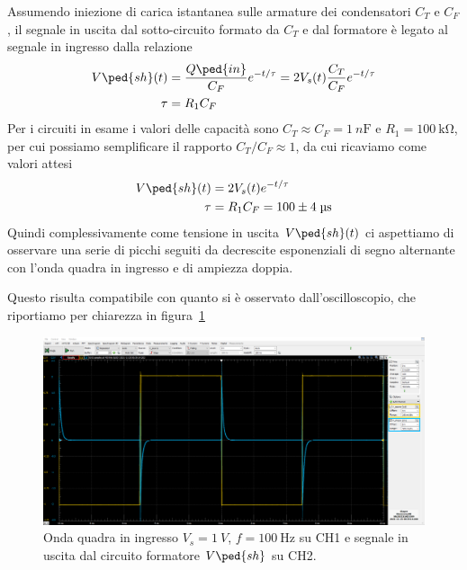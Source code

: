 \documentclass[10pt,a4paper]{article}
\begin{document}
Assumendo iniezione di carica istantanea sulle armature dei condensatori $C_T$
e $C_F$, il segnale in uscita dal sotto-circuito formato da $C_T$ e dal
formatore è legato al segnale in ingresso dalla relazione
\begin{align}\label{eq:Vsh}
V\ped{sh}(t) &= \frac{Q\ped{in}}{C_F} e^{-t/\tau} =
2V_s(t) \frac{C_T}{C_F} e^{-t/\tau} \\
\tau &= R_1 C_F
\end{align}
Per i circuiti in esame i valori delle capacità sono
$C_T \approx C_F = \SI{1}{n\F}$ e $R_1 = \SI{100}{\kilo\ohm}$,
per cui possiamo semplificare il rapporto $C_T/C_F \approx 1$, da cui
ricaviamo come valori attesi
\begin{align*}
V\ped{sh}(t) &= 2V_s(t) e^{-t/\tau} \\
\tau &= R_1 C_F = 100 \pm 4 \; \si{\micro\s}
\end{align*}
Quindi complessivamente come tensione in uscita $V\ped{sh} (t)$ ci aspettiamo
di osservare una serie di picchi seguiti da decrescite esponenziali di segno
alternante con l'onda quadra in ingresso e di ampiezza doppia.

Questo risulta compatibile con quanto si è osservato dall'oscilloscopio, che
riportiamo per chiarezza in figura~\ref{fig: shaper}
\begin{figure}[htbp]
    \centering
	\includegraphics[scale=0.335]{shaper}
    \caption{Onda quadra in ingresso $V_s = \SI{1}{V}$, $f = \SI{100}{\Hz}$
    su CH1 e segnale in uscita dal circuito formatore $V\ped{sh}$ su CH2.
    \label{fig: shaper}}
\end{figure}
\end{document}
